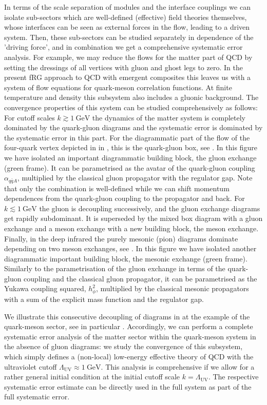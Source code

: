 \documentclass[aps,twocolumn,prd,superscriptaddress]{revtex4-2}
\begin{document}
In terms of the scale separation of modules and the interface couplings we can isolate sub-sectors which are well-defined (effective) field theories themselves, whose interfaces can be seen as external forces in the flow, leading to a driven system. Then, these sub-sectors can be studied separately in dependence of the 'driving force', and in combination we get a comprehensive systematic error analysis. For example, we may reduce the flows for the matter part of QCD by setting the dressings of all vertices with gluon and ghost legs to zero. In the present fRG approach to QCD with emergent composites this leaves us with a system of flow equations for quark-meson correlation functions. At finite temperature and density this subsystem also includes a gluonic background. The convergence properties of this system can be studied comprehensively as follows: For cutoff scales $k\gtrsim \qty{1}{\GeV}$ the dynamics of the matter system is completely dominated by the quark-gluon diagrams and the systematic error is dominated by the systematic error in this part. For the diagrammatic part of the flow of the four-quark vertex depicted in  in , this is the quark-gluon box, see . In this figure we have isolated an important diagrammatic building block, the gluon exchange (green frame). It can be parametrised as the avatar of the quark-gluon coupling $\alpha_{q\bar q A}$, multiplied by the classical gluon propagator with the regulator gap. Note that only the combination is well-defined while we can shift momentum dependences from the quark-gluon coupling to the propagator and back. For $k\lesssim \qty{1}{\GeV}$ the gluon is decoupling successively, and the gluon exchange diagrams get rapidly subdominant. It is superseded by the mixed box diagram with a gluon exchange and a meson exchange with a new building block, the meson exchange. Finally, in the deep infrared the purely mesonic (pion) diagrams dominate depending on two meson exchanges, see . In this figure we have isolated another diagrammatic important building block, the mesonic exchange (green frame). Similarly to the parametrisation of the gluon exchange in terms of the quark-gluon coupling and the classical gluon propagator, it can be parametrised as the Yukawa coupling squared, $h_\phi^2$, multiplied by the classical mesonic propagators with a sum of the explicit mass function and the regulator gap. 

We illustrate this consecutive decoupling of diagrams in  at the example of the quark-meson sector, see in particular . Accordingly, we can perform a complete systematic error analysis of the matter sector within the quark-meson system in the absence of gluon diagrams: we study the convergence of this subsystem, which simply defines a (non-local) low-energy effective theory of QCD with the ultraviolet cutoff $\Lambda_\textrm{UV}\approx \qty{1}{\GeV}$. This analysis is comprehensive if we allow for a rather general initial condition at the initial cutoff scale $k=\Lambda_\textrm{UV}$. The respective systematic error estimate can be directly used in the full system as part of the full systematic error.
\end{document}
